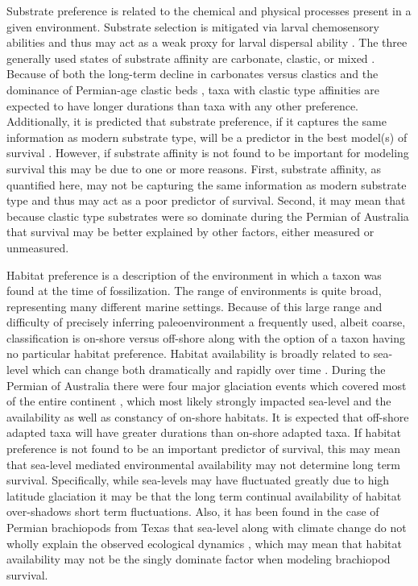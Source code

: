 \documentclass[12pt,letterpaper]{article}
\begin{document}
Substrate preference is related to the chemical and physical processes present in a given environment. Substrate selection is mitigated via larval chemosensory abilities and thus may act as a weak proxy for larval dispersal ability \citep{Jablonski2006a,Jablonski1983}. The three generally used states of substrate affinity are carbonate, clastic, or mixed \citep{Foote2006,Anderson2011a,Nurnberg2013a,Kiessling2007a,Miller2001}. Because of both the long-term decline in carbonates versus clastics \citep{Peters2008} and the dominance of Permian-age clastic beds \citep{Birgenheier2010,Percival2012,Thomas2007,Fielding2008a,Fielding2008}, taxa with clastic type affinities are expected to have longer durations than taxa with any other preference. Additionally, it is predicted that substrate preference, if it captures the same information as modern substrate type, will be a predictor in the best model(s) of survival \citep{Richardson1997,Richardson1997a}. However, if substrate affinity is not found to be important for modeling survival this may be due to one or more reasons. First, substrate affinity, as quantified here, may not be capturing the same information as modern substrate type and thus may act as a poor predictor of survival. Second, it may mean that because clastic type substrates were so dominate during the Permian of Australia that survival may be better explained by other factors, either measured or unmeasured. 

Habitat preference is a description of the environment in which a taxon was found at the time of fossilization. The range of environments is quite broad, representing many different marine settings. Because of this large range and difficulty of precisely inferring paleoenvironment a frequently used, albeit coarse, classification is on-shore versus off-shore \citep{Sepkoski1991,Kiessling2007a,Bottjer1988,Jablonski1991,Jablonski1983b} along with the option of a taxon having no particular habitat preference. Habitat availability is broadly related to sea-level which can change both dramatically and rapidly over time \citep{Olszewski2004}. During the Permian of Australia there were four major glaciation events which covered most of the entire continent \citep{Fielding2008,Birgenheier2010,Fielding2008a,Fielding2006}, which most likely strongly impacted sea-level and the availability as well as constancy of on-shore habitats. It is expected that off-shore adapted taxa will have greater durations than on-shore adapted taxa. If habitat preference is not found to be an important predictor of survival, this may mean that sea-level mediated environmental availability may not determine long term survival. Specifically, while sea-levels may have fluctuated greatly due to high latitude glaciation \citep{Fielding2008,Fielding2008a,Birgenheier2010} it may be that the long term continual availability of habitat over-shadows short term fluctuations. Also, it has been found in the case of Permian brachiopods from Texas that sea-level along with climate change do not wholly explain the observed ecological dynamics \citep{Olszewski2004}, which may mean that habitat availability may not be the singly dominate factor when modeling brachiopod survival. 
\end{document}
